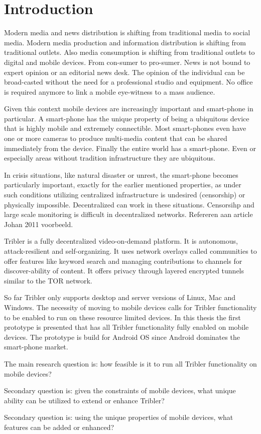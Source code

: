 \chapter{Introduction}

Modern media and news distribution is shifting from traditional media to social media.
Modern media production and information distribution is shifting from traditional outlets.
Also media consumption is shifting from traditional outlets to digital and mobile devices.
From con-sumer to pro-sumer.
News is not bound to expert opinion or an editorial news desk.
The opinion of the individual can be broad-casted without the need for a professional studio and equipment.
No office is required anymore to link a mobile eye-witness to a mass audience.

Given this context mobile devices are increasingly important and smart-phone in particular.
A smart-phone has the unique property of being a ubiquitous device that is highly mobile and extremely connectible.
Most smart-phones even have one or more cameras to produce multi-media content that can be shared immediately from the device.
Finally the entire world has a smart-phone.
Even or especially areas without tradition infrastructure they are ubiquitous.

In crisis situations, like natural disaster or unrest, the smart-phone becomes particularly important, exactly for the earlier mentioned properties, as under such conditions utilizing centralized infrastructure is undesired (censorship) or physically impossible.
Decentralized can work in these situations.
Censorsihp and large scale monitoring is difficult in decentralized networks.
Refereren aan article Johan 2011 voorbeeld.


Tribler is a fully decentralized video-on-demand platform.
It is autonomous, attack-resilient and self-organizing.
It uses network overlays called communities to offer features like keyword search and managing contributions to channels for discover-ability of content.
It offers privacy through layered encrypted tunnels similar to the TOR network.

So far Tribler only supports desktop and server versions of Linux, Mac and Windows.
The necessity of moving to mobile devices calls for Tribler functionality to be enabled to run on these resource limited devices.
In this thesis the first prototype is presented that has all Tribler functionality fully enabled on mobile devices.
The prototype is build for Android OS since Android dominates the smart-phone market.



The main research question is: how feasible is it to run all Tribler functionality on mobile devices? %

Secondary question is: given the constraints of mobile devices, what unique ability can be utilized to extend or enhance Tribler?

Secondary question is: using the unique properties of mobile devices, what features can be added or enhanced?

